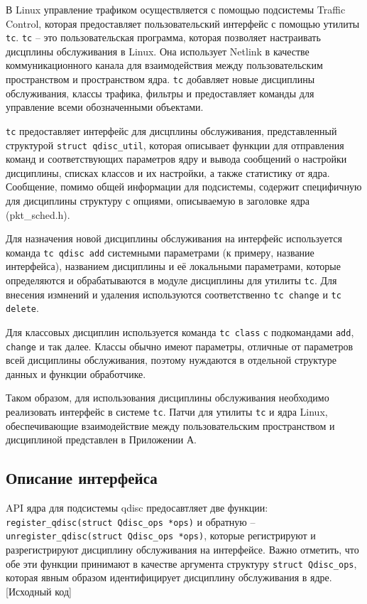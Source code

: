 	В Linux управление трафиком осуществляется с помощью подсистемы Traffic Control,
	которая предоставляет пользовательский интерфейс с помощью утилиты \texttt{tc}.
	\texttt{tc} -- это пользовательская программа, которая позволяет настраивать
	дисцплины обслуживания в Linux. Она использует Netlink в качестве
	коммуникационного канала для взаимодействия между пользовательским
	пространством и пространством ядра. \texttt{tc} добавляет новые дисциплины
	обслуживания, классы трафика, фильтры и предоставляет команды для
	управление всеми обозначенными объектами.\cite{tcpip}

	\texttt{tc} предоставляет интерфейс для дисцплины обслуживания,
	представленный структурой \lstinline{struct qdisc_util}, которая
	описывает функции для отправления команд и соответствующих параметров ядру
	и вывода сообщений о настройки дисциплины, списках классов и их настройки, а
	также статистику от ядра. Сообщение, помимо общей информации для подсистемы,
	содержит специфичную для дисциплины структуру с опциями, описываемую
	в заголовке ядра (pkt\_sched.h). 

	Для назначения новой дисциплины обслуживания на интерфейс используется
	команда \lstinline{tc qdisc add} системными параметрами (к примеру, название
	интерфейса), названием дисциплины и её локальными параметрами, которые
	определяются и обрабатываются в модуле дисциплины для утилиты \texttt{tc}. 
	Для внесения измнений и удаления используются соответственно \lstinline{tc change}
	и \lstinline{tc delete}.

	Для классовых дисциплин используется команда \lstinline{tc class} с подкомандами
	\lstinline{add}, \lstinline{change} и так далее. Классы обычно имеют параметры,
	отличные от параметров всей дисциплины обслуживания, поэтому нуждаются в отдельной
	структуре данных и функции обработчике.


	Таком образом, для использования дисциплины обслуживания необходимо
	реализовать интерфейс в системе \texttt{tc}. Патчи для утилиты \texttt{tc}
	и ядра Linux, обеспечивающие взаимодействие между пользовательским пространством
	и дисциплиной представлен в Приложении А. 

	\subsection{Описание интерфейса}

	API ядра для подсистемы qdisc предосавтляет две функции: \lstinline{register_qdisc(struct Qdisc_ops *ops)}
	и обратную -- \lstinline{unregister_qdisc(struct Qdisc_ops *ops)}, которые регистрируют
	и разрегистрируют дисциплину обслуживания на интерфейсе. Важно отметить, что обе эти
	функции принимают в качестве аргумента структуру \lstinline{struct Qdisc_ops},
	которая явным образом идентифицирует дисциплину обслуживания в ядре.[Исходный код]

